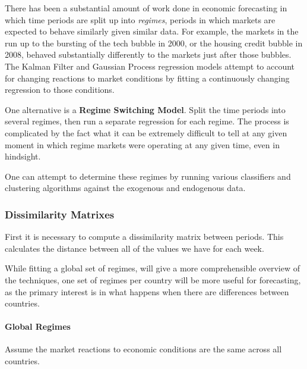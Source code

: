 \documentclass[]{article}
\let\oldparagraph\paragraph
\renewcommand{\paragraph}[1]{\oldparagraph{#1}\mbox{}}
\begin{document}
There has been a substantial amount of work done in economic forecasting
in which time periods are split up into \emph{regimes}, periods in which
markets are expected to behave similarly given similar data. For
example, the markets in the run up to the bursting of the tech bubble in
2000, or the housing credit bubble in 2008, behaved substantially
differently to the markets just after those bubbles. The Kalman Filter
and Gaussian Process regression models attempt to account for changing
reactions to market conditions by fitting a continuously changing
regression to those conditions.

One alternative is a \textbf{Regime Switching Model}. Split the time
periods into several regimes, then run a separate regression for each
regime. The process is complicated by the fact what it can be extremely
difficult to tell at any given moment in which regime markets were
operating at any given time, even in hindsight.

One can attempt to determine these regimes by running various
classifiers and clustering algorithms against the exogenous and
endogenous data.

\subsubsection{Dissimilarity Matrixes}\label{dissimilarity-matrixes}

First it is necessary to compute a dissimilarity matrix between periods.
This calculates the distance between all of the values we have for each
week.

While fitting a global set of regimes, will give a more comprehensible
overview of the techniques, one set of regimes per country will be more
useful for forecasting, as the primary interest is in what happens when
there are differences between countries.

\paragraph{Global Regimes}\label{global-regimes}

Assume the market reactions to economic conditions are the same across
all countries.
\end{document}
